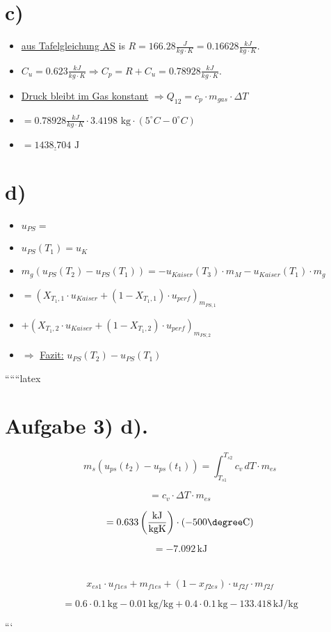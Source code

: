 \section*{c)}

\begin{itemize}
    \item \underline{aus Tafelgleichung AS} is $R = 166.28 \frac{J}{kg \cdot K} = 0.16628 \frac{kJ}{kg \cdot K}$.
    \item $C_u = 0.623 \frac{kJ}{kg \cdot K} \Rightarrow C_p = R + C_u = 0.78928 \frac{kJ}{kg \cdot K}$.
    \item \underline{Druck bleibt im Gas konstant} $\Rightarrow Q_{12} = c_p \cdot m_{gas} \cdot \Delta T$
    \item $= 0.78928 \frac{kJ}{kg \cdot K} \cdot 3.4198 \text{ kg} \cdot (5^\circ C - 0^\circ C)$
    \item $= 1 \underline{438.704} \text{ J}$
\end{itemize}

\section*{d)}

\begin{itemize}
    \item $u_{PS} =$
    \item $u_{PS} (T_1) = u_{K}$
    \item $m_g (u_{PS} (T_2) - u_{PS} (T_1)) = -u_{Kaiser} (T_3) \cdot m_{M} - u_{Kaiser} (T_1) \cdot m_{g}$
    \item $= (X_{T_1,1} \cdot u_{Kaiser} + (1 - X_{T_1,1}) \cdot u_{perf})_{m_{PS,1}}$
    \item $+ (X_{T_1,2} \cdot u_{Kaiser} + (1 - X_{T_1,2}) \cdot u_{perf})_{m_{PS,2}}$
    \item $\Rightarrow$ \underline{Fazit:} $u_{PS} (T_2) - u_{PS} (T_1)$
\end{itemize}

``````latex

\section*{Aufgabe 3) d).}

\[
m_s \left( u_{ps}(t_2) - u_{ps}(t_1) \right) = \int_{T_{s1}}^{T_{s2}} c_v \, dT \cdot m_{es}
\]

\[
= c_v \cdot \Delta T \cdot m_{es}
\]

\[
= 0.633 \left( \frac{\text{kJ}}{\text{kgK}} \right) \cdot (-500 \degree \text{C})
\]

\[
= -7.092 \, \text{kJ}
\]

\section*{}

\[
x_{es1} \cdot u_{f1es} + m_{f1es} + (1 - x_{f2es}) \cdot u_{f2f} \cdot m_{f2f}
\]

\[
= 0.6 \cdot 0.1 \, \text{kg} - 0.01 \, \text{kg/kg} + 0.4 \cdot 0.1 \, \text{kg} - 133.418 \, \text{kJ/kg}
\]

```